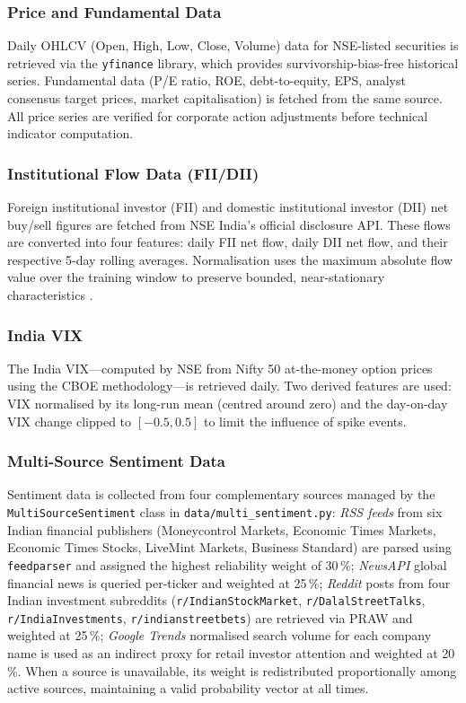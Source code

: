 \documentclass[ASNA,twocolumn]{USG}
\begin{document}
\subsubsection{Price and Fundamental Data}

Daily OHLCV (Open, High, Low, Close, Volume) data for NSE-listed securities
is retrieved via the \texttt{yfinance} library, which provides survivorship-bias-free
historical series. Fundamental data (P/E ratio, ROE, debt-to-equity, EPS,
analyst consensus target prices, market capitalisation) is fetched from the same
source. All price series are verified for corporate action adjustments before
technical indicator computation.

\subsubsection{Institutional Flow Data (FII/DII)}

Foreign institutional investor (FII) and domestic institutional investor (DII)
net buy/sell figures are fetched from NSE India's official disclosure API.
These flows are converted into four features: daily FII net flow, daily DII
net flow, and their respective 5-day rolling averages. Normalisation uses the
maximum absolute flow value over the training window to preserve bounded,
near-stationary characteristics \citep{lopez2018}.

\subsubsection{India VIX}

The India VIX---computed by NSE from Nifty 50 at-the-money option prices using
the CBOE methodology---is retrieved daily. Two derived features are used:
VIX normalised by its long-run mean (centred around zero) and the day-on-day
VIX change clipped to $[-0.5, 0.5]$ to limit the influence of spike events.

\subsubsection{Multi-Source Sentiment Data}

Sentiment data is collected from four complementary sources managed by the
\texttt{MultiSourceSentiment} class in \texttt{data/multi\_sentiment.py}:
\emph{RSS feeds} from six Indian financial publishers
(Moneycontrol Markets, Economic Times Markets, Economic Times Stocks,
LiveMint Markets, Business Standard) are parsed using \texttt{feedparser}
and assigned the highest reliability weight of 30\,\%; \emph{NewsAPI}
global financial news is queried per-ticker and weighted at 25\,\%;
\emph{Reddit} posts from four Indian investment subreddits
(\texttt{r/IndianStockMarket}, \texttt{r/DalalStreetTalks},
\texttt{r/IndiaInvestments}, \texttt{r/indianstreetbets}) are retrieved
via PRAW and weighted at 25\,\%; \emph{Google Trends} normalised search
volume for each company name is used as an indirect proxy for retail
investor attention and weighted at 20\,\%. When a source is unavailable,
its weight is redistributed proportionally among active sources,
maintaining a valid probability vector at all times.
\end{document}
